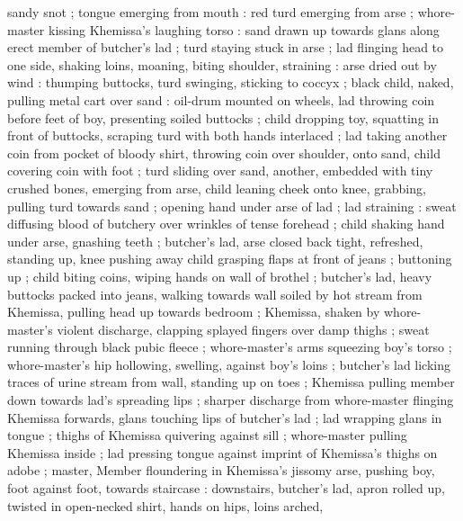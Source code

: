 sandy snot ; tongue emerging from mouth : red turd emerging from arse ; whore-master kissing Khemissa's laughing torso : sand drawn up towards glans along erect member of butcher's lad ; turd staying stuck in arse ; lad flinging head to one side, shaking loins, moaning, biting shoulder, straining : arse dried out by wind : thumping buttocks, turd swinging, sticking to coccyx ; black child, naked, pulling metal cart over sand :  oil-drum mounted on wheels, lad throwing coin before feet of boy, presenting soiled buttocks ; child dropping toy, squatting in front of buttocks, scraping turd with both hands interlaced ; lad taking another coin from pocket of bloody shirt, throwing coin over shoulder, onto sand, child covering coin with foot ; turd sliding over sand, another, embedded with tiny crushed bones, emerging from arse, child leaning cheek onto knee, grabbing, pulling turd towards sand ; opening hand under arse of lad ; lad straining : sweat diffusing blood of butchery over wrinkles of tense forehead ; child shaking hand under arse, gnashing teeth ; butcher's lad, arse closed back tight, refreshed, standing up, knee pushing away child grasping flaps at front of jeans ; buttoning up ; child biting coins, wiping hands on wall of brothel ; butcher's lad, heavy buttocks packed into jeans, walking towards wall soiled by hot stream from Khemissa, pulling head up towards bedroom ; Khemissa, shaken by whore-master's violent discharge, clapping splayed fingers over damp thighs ; sweat running through black pubic fleece ; whore-master's arms squeezing boy's torso ; whore-master's hip hollowing, swelling, against boy's loins ; butcher's lad licking traces of urine stream from wall, standing up on toes ; Khemissa pulling member down towards lad's spreading lips ; sharper discharge from whore-master flinging Khemissa forwards, glans touching lips of butcher's lad ; lad wrapping glans in tongue ; thighs of Khemissa quivering against sill ; whore-master pulling Khemissa inside ; lad pressing tongue against imprint of Khemissa's thighs on adobe ; master, Member floundering in Khemissa's jissomy arse, pushing boy, foot against foot, towards staircase : downstairs, butcher's lad, apron rolled up, twisted in open-necked shirt, hands on hips, loins arched, 

